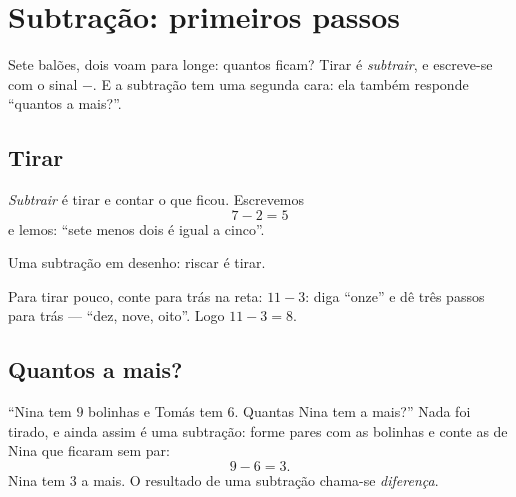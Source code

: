 \chapter{Subtração: primeiros passos}\label{ch:g1:subtraction}

Sete balões, dois voam para longe: quantos ficam? Tirar é
\emph{subtrair}, e escreve-se com o sinal $-$. E a subtração tem uma
segunda cara: ela também responde ``quantos a mais?''.

\section{Tirar}

\begin{definition}[Subtração]\label{def:g1:subtraction:def}
\emph{Subtrair} é tirar e contar o que ficou. Escrevemos
\[
7 - 2 = 5
\]
e lemos: ``sete menos dois é igual a cinco''.
\end{definition}

\begin{omfigure}

{\small Uma subtração em desenho: riscar é tirar.}
\end{omfigure}

\begin{example}\label{ex:g1:subtraction:countback}
Para tirar pouco, conte para trás na reta: $11 - 3$: diga ``onze'' e
dê três passos para trás --- ``dez, nove, oito''. Logo
$11 - 3 = 8$.
\end{example}

\section{Quantos a mais?}

\begin{example}[A diferença]\label{ex:g1:subtraction:difference}
``Nina tem $9$ bolinhas e Tomás tem $6$. Quantas Nina tem a mais?''
Nada foi tirado, e ainda assim é uma subtração: forme pares com as
bolinhas e conte as de Nina que ficaram sem par:
\[
9 - 6 = 3 .
\]
Nina tem $3$ a mais. O resultado de uma subtração chama-se
\emph{diferença}.
\end{example}

